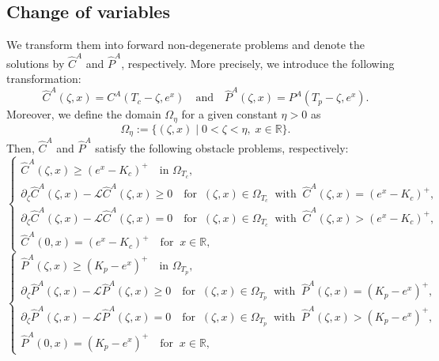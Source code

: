\documentclass[11pt, a4paper, leqno]{amsart}
\numberwithin{equation}{section}
\theoremstyle{plain}
\theoremstyle{definition}
\theoremstyle{remark}
\def\le{\leqslant}
\def\geq{\geqslant}
\begin{document}
\subsection{Change of variables}
We transform them into forward non-degenerate problems and denote
the solutions by $\widehat{C}^A$ and $\widehat{P}^A$, respectively. More precisely, we introduce the following transformation:
\begin{equation*}
    \widehat{C}^A(\zeta, x) = C^A(T_c-\zeta, e^x) \quad \text{and} \quad 
    \widehat{P}^A(\zeta, x) = P^A(T_p-\zeta, e^x). 
\end{equation*}
Moreover, we define the domain $\Omega_{\eta}$
for a given constant $\eta>0$ as
\begin{equation*}
    \Omega_\eta := \{(\zeta,x) \mid 0<\zeta <\eta, \; x\in\mathbb{R}\}.
\end{equation*}
Then, $\widehat{C}^A$ and $\widehat{P}^A$ satisfy the following obstacle problems, respectively:
\begin{equation} \label{CO}
    \begin{cases}
    {\widehat C^A(\zeta,x)\geq(e^x-K_c)^+\quad\text{in }\Omega_{T_c},}\\
        \partial_\zeta \widehat{C}^A(\zeta,x) -\mathcal{L} \widehat{C}^A(\zeta,x) \geq 0 \quad \text{for }\ (\zeta,x)\in \Omega_{T_c} \  \text{ with }\ \widehat{C}^A(\zeta,x) = (e^{x} - K_c)^+,\\
        \partial_\zeta \widehat{C}^A(\zeta,x) -\mathcal{L} \widehat{C}^A(\zeta,x) = 0 \quad \text{for }\ (\zeta,x)\in \Omega_{T_c} \  \text{ with }\   \widehat{C}^A(\zeta,x) > (e^{x} - K_c)^+,\\
        \widehat{C}^A(0,x) = (e^{x}-K_c)^+ \quad \text{for } \ x\in\mathbb{R},
    \end{cases}
\end{equation}
\begin{equation}\label{PO}
    \begin{cases}
    {\widehat P^A(\zeta,x)\geq(K_p-e^x)^+\quad\text{in }\Omega_{T_p},}\\
        \partial_\zeta \widehat{P}^A(\zeta,x) -\mathcal{L} \widehat{P}^A(\zeta,x) \geq 0 \quad  \text{for } \ (\zeta,x)\in \Omega_{T_p} \ \text{ with }\  \widehat{P}^A(\zeta,x) = (K_p - e^x)^+,\\
        \partial_\zeta \widehat{P}^A(\zeta,x) -\mathcal{L} \widehat{P}^A(\zeta,x) = 0 \quad \text{for } \ (\zeta,x)\in \Omega_{T_p} \ \text{ with }\   \widehat{P}^A(\zeta,x) > (K_p - e^x)^+,\\
        \widehat{P}^A(0,x) = (K_p - e^x)^+ \quad  \text{for } \ x\in\mathbb{R},
    \end{cases}
\end{equation}
\end{document}
